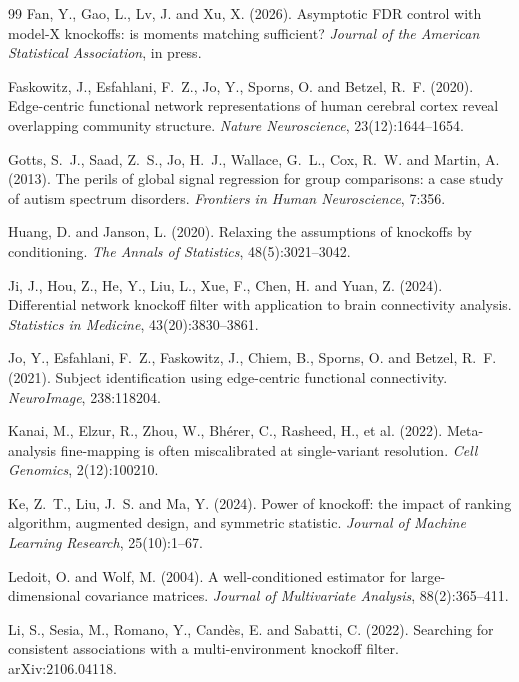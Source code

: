 \documentclass[11pt,a4paper]{article}
\begin{document}
\begin{thebibliography}{99}
Fan, Y., Gao, L., Lv, J. and Xu, X. (2026).
Asymptotic FDR control with model-X knockoffs: is moments matching
sufficient?
\emph{Journal of the American Statistical Association}, in press.

Faskowitz, J., Esfahlani, F.~Z., Jo, Y., Sporns, O. and Betzel, R.~F.
(2020).
Edge-centric functional network representations of human cerebral cortex
reveal overlapping community structure.
\emph{Nature Neuroscience}, 23(12):1644--1654.

Gotts, S.~J., Saad, Z.~S., Jo, H.~J., Wallace, G.~L., Cox, R.~W. and
Martin, A. (2013).
The perils of global signal regression for group comparisons: a case study
of autism spectrum disorders.
\emph{Frontiers in Human Neuroscience}, 7:356.

Huang, D. and Janson, L. (2020).
Relaxing the assumptions of knockoffs by conditioning.
\emph{The Annals of Statistics}, 48(5):3021--3042.

Ji, J., Hou, Z., He, Y., Liu, L., Xue, F., Chen, H. and Yuan, Z. (2024).
Differential network knockoff filter with application to brain connectivity
analysis.
\emph{Statistics in Medicine}, 43(20):3830--3861.

Jo, Y., Esfahlani, F.~Z., Faskowitz, J., Chiem, B., Sporns, O. and Betzel,
R.~F. (2021).
Subject identification using edge-centric functional connectivity.
\emph{NeuroImage}, 238:118204.

Kanai, M., Elzur, R., Zhou, W., Bhérer, C., Rasheed, H., et al. (2022).
Meta-analysis fine-mapping is often miscalibrated at single-variant
resolution.
\emph{Cell Genomics}, 2(12):100210.

Ke, Z.~T., Liu, J.~S. and Ma, Y. (2024).
Power of knockoff: the impact of ranking algorithm, augmented design, and
symmetric statistic.
\emph{Journal of Machine Learning Research}, 25(10):1--67.

Ledoit, O. and Wolf, M. (2004).
A well-conditioned estimator for large-dimensional covariance matrices.
\emph{Journal of Multivariate Analysis}, 88(2):365--411.

Li, S., Sesia, M., Romano, Y., Cand\`es, E. and Sabatti, C. (2022).
Searching for consistent associations with a multi-environment knockoff
filter.
arXiv:2106.04118.


\end{thebibliography}
\end{document}

